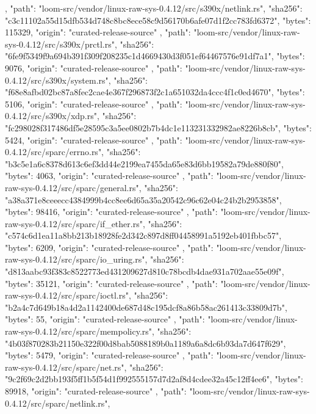 {{    },
    {
      "path": "loom-src/vendor/linux-raw-sys-0.4.12/src/s390x/netlink.rs",
      "sha256": "c3c11102a55d15dfb534d748c8bc8ece58c9d56170b6afe07d1f2cc783fd6372",
      "bytes": 115329,
      "origin": "curated-release-source"
    },
    {
      "path": "loom-src/vendor/linux-raw-sys-0.4.12/src/s390x/prctl.rs",
      "sha256": "6fe9f5349f9a694b391f309f208235c1d4669430d3f051ef64467576e91df7a1",
      "bytes": 9076,
      "origin": "curated-release-source"
    },
    {
      "path": "loom-src/vendor/linux-raw-sys-0.4.12/src/s390x/system.rs",
      "sha256": "f68e8afbd02bc87a8fec2cae4e367f296873f2c1a651032da4ccc4f1c0ed4670",
      "bytes": 5106,
      "origin": "curated-release-source"
    },
    {
      "path": "loom-src/vendor/linux-raw-sys-0.4.12/src/s390x/xdp.rs",
      "sha256": "fc298028f317486df5e28595c3a5ee0802b7b4dc1e113231332982ae8226b8cb",
      "bytes": 5424,
      "origin": "curated-release-source"
    },
    {
      "path": "loom-src/vendor/linux-raw-sys-0.4.12/src/sparc/errno.rs",
      "sha256": "b3c5e1a6c8378d613c6ef3dd44e2199ea7455da65e83d6bb19582a79de880f80",
      "bytes": 4063,
      "origin": "curated-release-source"
    },
    {
      "path": "loom-src/vendor/linux-raw-sys-0.4.12/src/sparc/general.rs",
      "sha256": "a38a371e8ceeecc4384999b4cc8ee6d65a35a20542c96c62e04c24b2b2953858",
      "bytes": 98416,
      "origin": "curated-release-source"
    },
    {
      "path": "loom-src/vendor/linux-raw-sys-0.4.12/src/sparc/if_ether.rs",
      "sha256": "c574c6d1ea11a8bb213b18928fe2d342c897d8ff04458991a5192eb401fbbc57",
      "bytes": 6209,
      "origin": "curated-release-source"
    },
    {
      "path": "loom-src/vendor/linux-raw-sys-0.4.12/src/sparc/io_uring.rs",
      "sha256": "d813aabc93f383c8522773ed431209627d810c78bcdb4dae931a702aae55e09f",
      "bytes": 35121,
      "origin": "curated-release-source"
    },
    {
      "path": "loom-src/vendor/linux-raw-sys-0.4.12/src/sparc/ioctl.rs",
      "sha256": "b2a4c7d649b18a4d2a1142400de687d48c195dcf8a86b58ac261413c33809d7b",
      "bytes": 55,
      "origin": "curated-release-source"
    },
    {
      "path": "loom-src/vendor/linux-raw-sys-0.4.12/src/sparc/mempolicy.rs",
      "sha256": "4b03f870283b21150e322f00d8bab5088189b0a1189a6a8dc6b93da7d647f629",
      "bytes": 5479,
      "origin": "curated-release-source"
    },
    {
      "path": "loom-src/vendor/linux-raw-sys-0.4.12/src/sparc/net.rs",
      "sha256": "9c2f69c2d2bb193f5ff1b5f54d1f992555157d7d2af8d4cdee32a45c12ff4ee6",
      "bytes": 89918,
      "origin": "curated-release-source"
    },
    {
      "path": "loom-src/vendor/linux-raw-sys-0.4.12/src/sparc/netlink.rs",
}}
